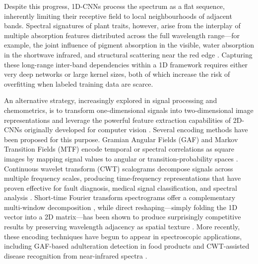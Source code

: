 Despite this progress, 1D-CNNs process the spectrum as a flat sequence, inherently limiting their receptive field to local neighbourhoods of adjacent bands. Spectral signatures of plant traits, however, arise from the interplay of multiple absorption features distributed across the full wavelength range---for example, the joint influence of pigment absorption in the visible, water absorption in the shortwave infrared, and structural scattering near the red edge \citep{curran1989imaging, homolova2013review}. Capturing these long-range inter-band dependencies within a 1D framework requires either very deep networks or large kernel sizes, both of which increase the risk of overfitting when labeled training data are scarce.

An alternative strategy, increasingly explored in signal processing and chemometrics, is to transform one-dimensional signals into two-dimensional image representations and leverage the powerful feature extraction capabilities of 2D-CNNs originally developed for computer vision \citep{wang2015gaf, garcia2022temporal}. Several encoding methods have been proposed for this purpose. Gramian Angular Fields (GAF) and Markov Transition Fields (MTF) encode temporal or spectral correlations as square images by mapping signal values to angular or transition-probability spaces \citep{wang2015gaf, ganesan2021gaf}. Continuous wavelet transform (CWT) scalograms decompose signals across multiple frequency scales, producing time-frequency representations that have proven effective for fault diagnosis, medical signal classification, and spectral analysis \citep{addison2017wavelet, Lopatin2023-fn, ong2025sugarcane, zhuang2023cwt}. Short-time Fourier transform spectrograms offer a complementary multi-window decomposition \citep{shuai2025multichannel}, while direct reshaping---simply folding the 1D vector into a 2D matrix---has been shown to produce surprisingly competitive results by preserving wavelength adjacency as spatial texture \citep{hennessy2022reshaping, deev2024spectrum, sharma2019deepinsight}. More recently, these encoding techniques have begun to appear in spectroscopic applications, including GAF-based adulteration detection in food products \citep{zhang2025gaf} and CWT-assisted disease recognition from near-infrared spectra \citep{ong2025sugarcane}.

